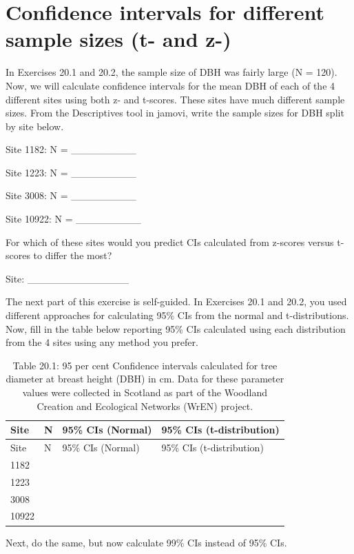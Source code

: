 \documentclass[
]{scrbook}
\begin{document}
\hypertarget{confidence-intervals-for-different-sample-sizes-t--and-z-}{%
\section{Confidence intervals for different sample sizes (t- and z-)}\label{confidence-intervals-for-different-sample-sizes-t--and-z-}}

In Exercises 20.1 and 20.2, the sample size of DBH was fairly large (N = 120).
Now, we will calculate confidence intervals for the mean DBH of each of the 4 different sites using both z- and t-scores.
These sites have much different sample sizes.
From the Descriptives tool in jamovi, write the sample sizes for DBH split by site below.

Site 1182: N = \_\_\_\_\_\_\_\_\_

Site 1223: N = \_\_\_\_\_\_\_\_\_

Site 3008: N = \_\_\_\_\_\_\_\_\_

Site 10922: N = \_\_\_\_\_\_\_\_\_

For which of these sites would you predict CIs calculated from z-scores versus t-scores to differ the most?

Site: \_\_\_\_\_\_\_\_\_\_\_\_\_\_

The next part of this exercise is self-guided.
In Exercises 20.1 and 20.2, you used different approaches for calculating 95\% CIs from the normal and t-distributions.
Now, fill in the table below reporting 95\% CIs calculated using each distribution from the 4 sites using any method you prefer.

\begin{longtable}[]{@{}llll@{}}
\caption{Table 20.1: 95 per cent Confidence intervals calculated for tree diameter at breast height (DBH) in cm. Data for these parameter values were collected in Scotland as part of the Woodland Creation and Ecological Networks (WrEN) project.}\tabularnewline
\toprule
Site & N & 95\% CIs (Normal) & 95\% CIs (t-distribution) \\
\midrule
\endfirsthead
\toprule
Site & N & 95\% CIs (Normal) & 95\% CIs (t-distribution) \\
\midrule
\endhead
1182 & & & \\
1223 & & & \\
3008 & & & \\
10922 & & & \\
\bottomrule
\end{longtable}

Next, do the same, but now calculate 99\% CIs instead of 95\% CIs.
\end{document}
